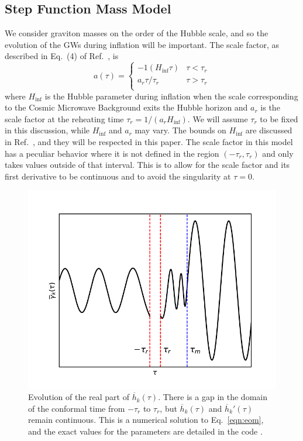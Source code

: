 \documentclass[prd,twocolumn,aps,psfig,nofootinbib,nobibnotes,superscriptaddress,preprintnumbers,times]{revtex4-2}
\begin{document}
\subsection{Step Function Mass Model}
We consider graviton masses on the order of the Hubble scale, and so the evolution of the GWs during inflation will be important.
The scale factor, as described in Eq.\ (4) of Ref.\ \cite{Fujita:2018}, is
\begin{equation}\label{eqn:scale_fac}
    a(\tau) = 
    \begin{cases}
            -1(H_{\inf}\tau) & \tau < \tau_r \\
            a_r \tau/\tau_r & \tau > \tau_r \\
   \end{cases}
\end{equation}
where $H_{\inf}$ is the Hubble parameter during inflation when the scale corresponding to the Cosmic Microwave Background exits the Hubble horizon and $a_r$ is the scale factor at the reheating time $\tau_r = 1/(a_r H_{\inf})$. We will assume $\tau_r$ to be fixed in this discussion, while $H_{\inf}$ and $a_r$ may vary. The bounds on $H_{\inf}$ are discussed in Ref.\ \cite{Jiang:2017}, and they will be respected in this paper. The scale factor in this model has a peculiar behavior where it is not defined in the region $(-\tau_r, \tau_r)$ and only takes values outside of that interval. This is to allow for the scale factor and its first derivative to be continuous and to avoid the singularity at $\tau = 0$. %
\begin{figure}[h]
\includegraphics[scale=0.65]{fig/fig0.pdf}
\caption{Evolution of the real part of $\overline{h}_k(\tau)$. There is a gap in the domain of the conformal time from $-\tau_r$ to $\tau_r$, but $\overline{h}_k(\tau)$ and $\overline{h}_k'(\tau)$ remain continuous. This is a numerical solution to Eq.\ \ref{eqn:eom}, and the exact values for the parameters are detailed in the code \cite{GH}.}
\label{fig:mode}
\end{figure}
\end{document}
